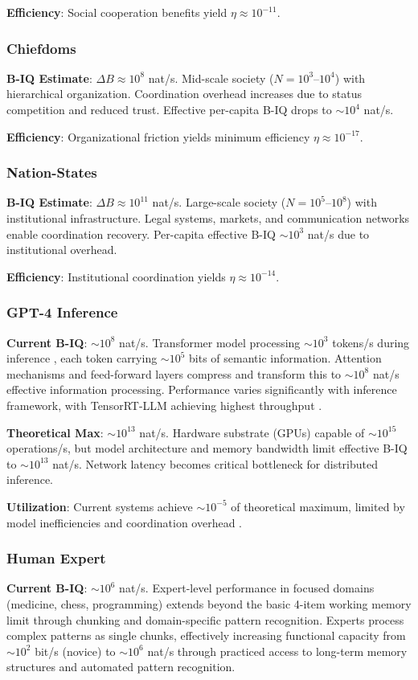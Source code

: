 \documentclass[10pt,conference]{IEEEtran}
\begin{document}
\textbf{Efficiency}: Social cooperation benefits yield $\eta \approx 10^{-11}$.

\subsubsection{Chiefdoms}
\textbf{B-IQ Estimate}: $\Delta B \approx 10^8$ nat/s. Mid-scale society ($N = 10^3$--$10^4$) with hierarchical organization. Coordination overhead increases due to status competition and reduced trust. Effective per-capita B-IQ drops to $\sim 10^4$ nat/s.

\textbf{Efficiency}: Organizational friction yields minimum efficiency $\eta \approx 10^{-17}$.

\subsubsection{Nation-States}
\textbf{B-IQ Estimate}: $\Delta B \approx 10^{11}$ nat/s. Large-scale society ($N = 10^5$--$10^8$) with institutional infrastructure. Legal systems, markets, and communication networks enable coordination recovery. Per-capita effective B-IQ $\sim 10^3$ nat/s due to institutional overhead.

\textbf{Efficiency}: Institutional coordination yields $\eta \approx 10^{-14}$.

\subsubsection{GPT-4 Inference}
\textbf{Current B-IQ}: $\sim 10^8$ nat/s. Transformer model processing $\sim 10^3$ tokens/s during inference \cite{goel2024}, each token carrying $\sim 10^5$ bits of semantic information. Attention mechanisms and feed-forward layers compress and transform this to $\sim 10^8$ nat/s effective information processing. Performance varies significantly with inference framework, with TensorRT-LLM achieving highest throughput \cite{erdil2024}.

\textbf{Theoretical Max}: $\sim 10^{13}$ nat/s. Hardware substrate (GPUs) capable of $\sim 10^{15}$ operations/s, but model architecture and memory bandwidth limit effective B-IQ to $\sim 10^{13}$ nat/s. Network latency becomes critical bottleneck for distributed inference.

\textbf{Utilization}: Current systems achieve $\sim 10^{-5}$ of theoretical maximum, limited by model inefficiencies and coordination overhead \cite{erdil2024}.

\subsubsection{Human Expert}
\textbf{Current B-IQ}: $\sim 10^6$ nat/s. Expert-level performance in focused domains (medicine, chess, programming) extends beyond the basic 4-item working memory limit \cite{miller2015} through chunking and domain-specific pattern recognition. Experts process complex patterns as single chunks, effectively increasing functional capacity from $\sim 10^2$ bit/s (novice) to $\sim 10^6$ nat/s through practiced access to long-term memory structures and automated pattern recognition.
\end{document}
